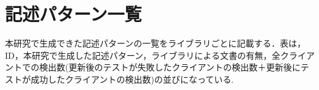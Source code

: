 \documentclass[11pt]{jreport}
\begin{document}







%
\appendix

\chapter{記述パターン一覧}

本研究で生成できた記述パターンの一覧をライブラリごとに記載する．表は，ID，本研究で生成した記述パターン，ライブラリによる文書の有無，全クライアントでの検出数(更新後のテストが失敗したクライアントの検出数＋更新後にテストが成功したクライアントの検出数)の並びになっている.
\end{document}
